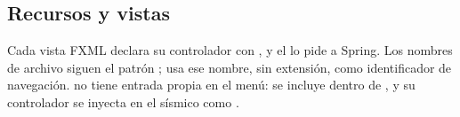 \subsection{Recursos y vistas}

Cada vista FXML declara su controlador con , y el  lo pide a Spring. Los nombres
de archivo siguen el patrón ;  usa ese nombre, sin extensión, como
identificador de navegación.  no tiene entrada propia en el menú: se incluye dentro de
, y su controlador se inyecta en el sísmico como .
